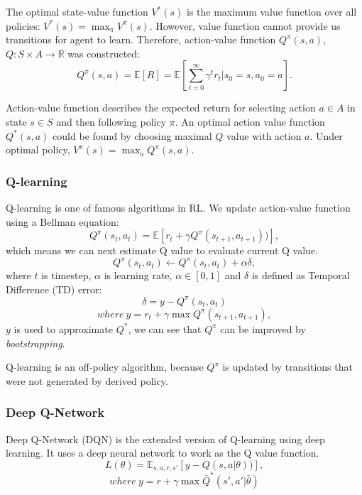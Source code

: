 \documentclass[11pt,twocolumn]{jarticle} %
\begin{document}
The optimal state-value function $V^*(s)$ is the maximum value function over all policies:
$ V^*(s) = \max_\pi V^\pi(s) $.
However, value function cannot provide us transitions for agent to learn. Therefore, action-value function $Q^\pi(s, a)$, $Q: S \times A \rightarrow \mathbb{R}$ was constructed:
\begin{equation}
Q^\pi(s, a) = \mathbb{E}[R] = \mathbb{E}[\sum_{t=0}^{\infty}\gamma^t r_t | s_0 = s, a_0 = a]. 
\end{equation}

Action-value function describes the expected return for selecting action $a \in A$ in state $s \in S$ and then following policy $\pi$. An optimal action value function $Q^*(s, a)$ could be found by choosing maximal $Q$ value with action $a$. Under optimal policy, $V^\pi(s) = \max_a{Q^\pi(s, a)}$.

\subsubsection{Q-learning\cite{qlearning}}

Q-learning is one of famous algorithms in RL. We update action-value function using a Bellman equation: 
\begin{equation}
Q^\pi(s_t, a_t) = \mathbb{E}[r_{t} + \gamma Q^\pi(s_{t+1}, a_{t+1}))],  
\end{equation}
which means we can next estimate Q value to evaluate current Q value.
\begin{equation}
Q^\pi(s_t, a_t) \leftarrow Q^\pi(s_t, a_t) + \alpha\delta,
\end{equation}
where $t$ is timestep, $\alpha$ is learning rate, $\alpha \in [0, 1]$ and $\delta$ is defined as Temporal Difference (TD) error:
\begin{equation}
\delta = y - Q^\pi(s_t, a_t)
\end{equation}
$$where \ y = r_t + \gamma\max Q^\pi(s_{t+1}, a_{t+1}),$$
$y$ is used to approximate $Q^*$, we can see that $Q^\pi$ can be improved by \textsl{bootstrapping}.\par 
Q-learning is an off-policy algorithm, because $Q^\pi$ is updated by transitions that were not generated by derived policy.

\subsubsection{Deep Q-Network\cite{dqn}}

Deep Q-Network (DQN) is the extended version of Q-learning using deep learning. It uses a deep neural network to work as the Q value function. 
\begin{equation} \label{eq:dqn-loss}
L(\theta) = \mathbb{E}_{s,a,r,s'}[y - Q(s, a|\theta))],  
\end{equation}
$$where \ y = r + \gamma\max \bar{Q}^*(s', a'|\bar{\theta})$$
\end{document}
